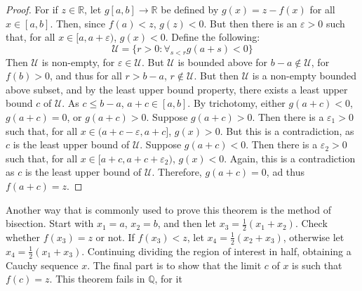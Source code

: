             \begin{proof}
                For if $z\in\mathbb{R}$, let
                $g[a,b]\rightarrow\mathbb{R}$ be defined by
                $g(x)=z-f(x)$ for all $x\in[a,b]$. Then,
                since $f(a)<z$, $g(z)<0$. But then there
                is an $\varepsilon>0$ such that, for
                all $x\in[a,a+\varepsilon)$,
                $g(x)<0$. Define the following:
                \begin{equation}
                    \mathcal{U}=
                    \{r>0:\forall_{s<r}g(a+s)<0\}
                \end{equation}
                Then $\mathcal{U}$ is non-empty, for
                $\varepsilon\in\mathcal{U}$. But
                $\mathcal{U}$ is bounded above for
                $b-a\notin\mathcal{U}$, for
                $f(b)>0$, and thus for all
                $r>b-a$, $r\notin\mathcal{U}$. But then
                $\mathcal{U}$ is a non-empty bounded
                above subset, and by the least upper
                bound property, there exists a least
                upper bound $c$ of $\mathcal{U}$.
                As $c\leq{b-a}$, $a+c\in[a,b]$.
                By trichotomy, either $g(a+c)<0$,
                $g(a+c)=0$, or $g(a+c)>0$. Suppose
                $g(a+c)>0$. Then there is a
                $\varepsilon_{1}>0$ such that,
                for all $x\in(a+c-\varepsilon,a+c]$,
                $g(x)>0$. But this is a contradiction,
                as $c$ is the least upper bound of
                $\mathcal{U}$. Suppose $g(a+c)<0$.
                Then there is a $\varepsilon_{2}>0$
                such that, for all
                $x\in[a+c,a+c+\varepsilon_{2})$,
                $g(x)<0$. Again, this is a contradiction
                as $c$ is the least upper bound of
                $\mathcal{U}$. Therefore, $g(a+c)=0$,
                ad thus $f(a+c)=z$.
            \end{proof}
            Another way that is commonly used to prove this
            theorem is the method of bisection. Start with
            $x_{1}=a$, $x_{2}=b$, and then let
            $x_{3}=\tfrac{1}{2}(x_{1}+x_{2})$. Check whether
            $f(x_{3})=z$ or not. If $f(x_{3})<z$,
            let $x_{4}=\tfrac{1}{2}(x_{2}+x_{3})$, otherwise
            let $x_{4}=\tfrac{1}{2}(x_{1}+x_{3})$. Continuing
            dividing the region of interest in half, obtaining
            a Cauchy sequence $x$. The final part
            is to show that the limit $c$ of $x$ is such that
            $f(c)=z$. This theorem fails in $\mathbb{Q}$, for it
